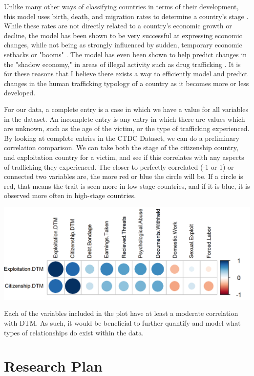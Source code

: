\documentclass{article} %
\begin{document}
Unlike many other ways of classifying countries in terms of their development, this model uses birth, death, and migration rates to determine a country's stage \parencite{bongaarts2009}. While these rates are not directly related to a country's economic growth or decline, the model has been shown to be very successful at expressing economic changes, while not being as strongly influenced by sudden, temporary economic setbacks or "booms" \parencite{kirk1996,bar2010,galor2000}. The model has even been shown to help predict changes in the "shadow economy," in areas of illegal activity such as drug trafficking \parencite{sch1994}. It is for these reasons that I believe there exists a way to efficiently model and predict changes in the human trafficking typology of a country as it becomes more or less developed.

For our data, a complete entry is a case in which we have a value for all variables in the dataset. An incomplete entry is any entry in which there are values which are unknown, such as the age of the victim, or the type of trafficking experienced. By looking at complete entries in the CTDC Dataset, we can do a preliminary correlation comparison. We can take both the stage of the citizenship country, and exploitation country for a victim, and see if this correlates with any aspects of trafficking they experienced. The closer to perfectly correlated (-1 or 1) or connected two variables are, the more red or blue the circle will be. If a circle is red, that means the trait is seen more in low stage countries, and if it is blue, it is observed more often in high-stage countries.

\hspace*{-1.5cm}
\includegraphics{Corrplot} \bigskip

Each of the variables included in the plot have at least a moderate correlation with DTM. As such, it would be beneficial to further quantify and model what types of relationships do exist within the data.


\section{Research Plan}
\end{document}
